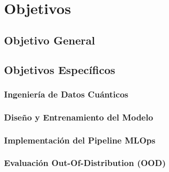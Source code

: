 \chapter{Objetivos}\label{ch:objetivos}

\section{Objetivo General}

\section{Objetivos Específicos}
\subsection{Ingeniería de Datos Cuánticos}
\subsection{Diseño y Entrenamiento del Modelo}
\subsection{Implementación del Pipeline MLOps}
\subsection{Evaluación Out-Of-Distribution (OOD)}